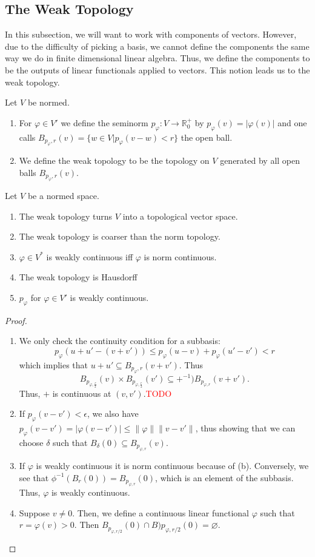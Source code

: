 \documentclass[prb,12pt]{revtex4-2}
\theoremstyle{definition}
\theoremstyle{definition}
\theoremstyle{definition}
\newenvironment{parts}{\begin{enumerate}[label=(\alph*)]}{\end{enumerate}}
\newcommand{\R}{\mathbb{R}}
\begin{document}
\subsection{The Weak Topology}
In this subsection, we will want to work with components of vectors. However, due to the difficulty of picking a basis, we cannot define the components the same way we do in finite dimensional linear algebra. Thus, we define the components to be the outputs of linear functionals applied to vectors. This notion leads us to the weak topology.
\begin{Definition}
	Let $V$ be normed.
	\begin{parts}
	\item For $\varphi\in V'$ we define the seminorm $p_\varphi:V \to \R_0^+$ by $p_\varphi(v)=|\varphi(v)|$ and one calls $B_{p_\varphi, r}(v) =\{w\in V|p_\varphi(v-w)<r\} $ the open ball.
	\item We define the weak topology to be the topology on $V$ generated by all open balls $B_{p_{\varphi}, r}(v)$.
	\end{parts}
\end{Definition}
\begin{Theorem}
	Let $V$ be a normed space.
	\begin{parts}
	\item The weak topology turns $V$ into a topological vector space.
	\item The weak topology is coarser than the norm topology.
	\item $\varphi\in V^*$ is weakly continuous iff $\varphi$ is norm continuous.
	\item The weak topology is Hausdorff
	\item $p_\varphi$ for $\varphi\in V'$ is weakly continuous.
	\end{parts}
\end{Theorem}
\begin{proof}
	\begin{parts}
	\item We only check the continuity condition for a subbasis:
		\[
		p_\varphi(u+u'-(v+v'))\le p_\varphi(u-v)+p_\varphi(u'-v')< r
	\]
	which implies that $u+u'\subseteq B_{p_{\varphi}, r}(v+v')$. Thus
	\[
		B_{p_{\varphi, \frac{r}{2}}}(v)\times B_{p_{\varphi, \frac{r}{2}}}(v')\subseteq +^{-1})B_{p_{\varphi, r}}(v+v')
	.\] 
	Thus, $+$ is continuous at $(v, v')$.\textcolor{red}{TODO}
\item If $p_\varphi(v-v')<\epsilon$, we also have $p_\varphi(v-v')=|\varphi(v-v')| \le \| \varphi\| \|v-v'\|$, thus showing that we can choose $\delta$ such that $B_\delta(0)\subseteq B_{p_{\varphi, r}}(v)$.
\item If  $\varphi$ is weakly continuous it is norm continuous because of (b). Conversely, we see that $\phi^{-1}(B_r(0))=B_{p_{\varphi,r}}(0)$, which is an element of the subbasis. Thus, $\varphi$ is weakly continuous.
\item Suppose $v\neq 0$. Then, we define a continuous linear functional $\varphi$ such that $r=\varphi(v)>0$. Then $B_{p_{\varphi, r / 2}}(0)\cap B){p_{\varphi, r / 2}}(0)=\varnothing$.
	\end{parts}
\end{proof}
\end{document}
